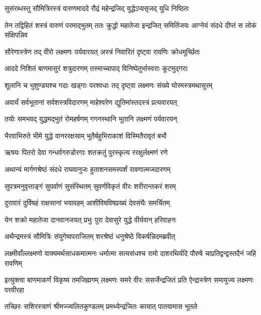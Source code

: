 \twolineshloka
{सुसंरब्धस्तु सौमित्रिरस्त्रं वारुणमाददे}
{रौद्रं महेन्द्रजिद् युद्धेऽप्यसृजद् युधि निष्ठितः} %

\threelineshloka
{तेन तद्विहितं शस्त्रं वारुणं परमाद्भुतम्}
{ततः क्रुद्धो महातेजा इन्द्रजित् समितिंजयः}
{आग्नेयं संदधे दीप्तं स लोकं संक्षिपन्निव} %

\twolineshloka
{सौरेणास्त्रेण तद् वीरो लक्ष्मणः पर्यवारयत्}
{अस्त्रं निवारितं दृष्ट्वा रावणिः क्रोधमूर्च्छितः} %

\twolineshloka
{आददे निशितं बाणमासुरं शत्रुदारणम्}
{तस्माच्चापाद् विनिष्पेतुर्भास्वराः कूटमुद्गराः} %

\twolineshloka
{शूलानि च भुशुण्ड्यश्च गदाः खड्गाः परश्वधाः}
{तद् दृष्ट्वा लक्ष्मणः संख्ये घोरमस्त्रमथासुरम्} %

\twolineshloka
{अवार्यं सर्वभूतानां सर्वशस्त्रविदारणम्}
{माहेश्वरेण द्युतिमांस्तदस्त्रं प्रत्यवारयत्} %

\twolineshloka
{तयोः समभवद् युद्धमद्भुतं रोमहर्षणम्}
{गगनस्थानि भूतानि लक्ष्मणं पर्यवारयन्} %

\twolineshloka
{भैरवाभिरुते भीमे युद्धे वानररक्षसाम्}
{भूतैर्बहुभिराकाशं विस्मितैरावृतं बभौ} %

\twolineshloka
{ऋषयः पितरो देवा गन्धर्वगरुडोरगाः}
{शतक्रतुं पुरस्कृत्य ररक्षुर्लक्ष्मणं रणे} %

\twolineshloka
{अथान्यं मार्गणश्रेष्ठं संदधे राघवानुजः}
{हुताशनसमस्पर्शं रावणात्मजदारणम्} %

\twolineshloka
{सुपत्रमनुवृत्ताङ्गं सुपर्वाणं सुसंस्थितम्}
{सुवर्णविकृतं वीरः शरीरान्तकरं शरम्} %

\twolineshloka
{दुरावारं दुर्विषहं राक्षसानां भयावहम्}
{आशीविषविषप्रख्यं देवसंघैः समर्चितम्} %

\twolineshloka
{येन शक्रो महातेजा दानवानजयत् प्रभुः}
{पुरा देवासुरे युद्धे वीर्यवान् हरिवाहनः} %

\twolineshloka
{अथैन्द्रमस्त्रं सौमित्रिः संयुगेष्वपराजितम्}
{शरश्रेष्ठं धनुश्रेष्ठे विकर्षन्निदमब्रवीत्} %

\threelineshloka
{लक्ष्मीवाँल्लक्ष्मणो वाक्यमर्थसाधकमात्मनः}
{धर्मात्मा सत्यसंधश्च रामो दाशरथिर्यदि}
{पौरुषे चाप्रतिद्वन्द्वस्तदैनं जहि रावणिम्} %

\threelineshloka
{इत्युक्त्वा बाणमाकर्णं विकृष्य तमजिह्मगम्}
{लक्ष्मणः समरे वीरः ससर्जेन्द्रजितं प्रति}
{ऐन्द्रास्त्रेण समायुज्य लक्ष्मणः परवीरहा} %

\twolineshloka
{तच्छिरः सशिरस्त्राणं श्रीमज्ज्वलितकुण्डलम्}
{प्रमथ्येन्द्रजितः कायात् पातयामास भूतले} %

